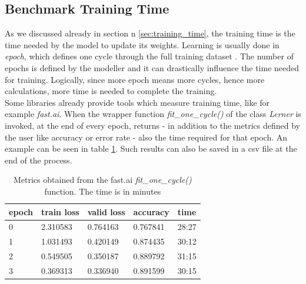 \subsection{Benchmark Training Time}\label{b_trainig_time}
As we discussed already in section n \ref{sec:training_time}, the training time is the time needed by the model to update its weights. Learning is usually done in \textit{epoch}, which defines one cycle through the full training dataset \cite{Afaq2020SignificanceOE}. The number of epochs is defined by the modeller and it can drastically influence the time needed for training. Logically, since more epoch means more cycles, hence more calculations, more time is needed to complete the training.\\
Some libraries already provide tools which measure training time, like for example \textit{fast.ai}. When the wrapper function \textit{fit\_one\_cycle()} of the class \textit{Lerner} is invoked, at the end of every epoch, returns - in addition to the metrics defined by the user like accuracy or error rate - also the time required for that epoch. An example can be seen in table \ref{tab:m_fast}. Such results can also be saved in a csv file at the end of the process. \\
\begin{table}[h]
\centering
\begin{tabular}{ p{1cm} p{2cm} p{2cm} p{2cm} p{2cm}   }
 epoch&train loss &valid loss & accuracy &time\\
 \hline
0	&2.310583	&0.764163	&0.767841	&28:27\\
1	&1.031493	&0.420149	&0.874435	&30:12\\
2	&0.549505	&0.350187	&0.889792	&31:15\\
3	&0.369313	&0.336940	&0.891599	&30:15\\

 \hline
\end{tabular}
\caption[Metrics obtained from the fast.ai \textit{fit\_one\_cycle()} function]{Metrics obtained from the fast.ai \textit{fit\_one\_cycle()} function. The time is in minutes}
\label{tab:m_fast}
\end{table}


